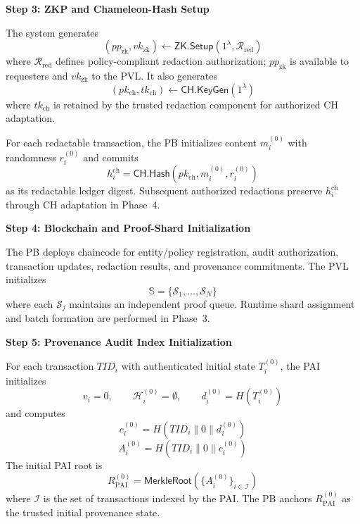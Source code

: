 \documentclass[lettersize,journal]{IEEEtran}
\begin{document}
\noindent\textbf{Step 3: ZKP and Chameleon-Hash Setup}

The system generates
\begin{equation}
(pp_{\mathrm{zk}},vk_{\mathrm{zk}})
\leftarrow
\mathsf{ZK.Setup}(1^\lambda,\mathcal{R}_{\mathrm{red}})
\label{eq:zk-setup}
\end{equation}
where $\mathcal{R}_{\mathrm{red}}$ defines policy-compliant redaction
authorization; $pp_{\mathrm{zk}}$ is available to requesters and
$vk_{\mathrm{zk}}$ to the PVL. It also generates
\begin{equation}
(pk_{\mathrm{ch}},tk_{\mathrm{ch}})
\leftarrow
\mathsf{CH.KeyGen}(1^\lambda)
\label{eq:ch-setup}
\end{equation}
where $tk_{\mathrm{ch}}$ is retained by the trusted redaction component
for authorized CH adaptation.

For each redactable transaction, the PB initializes content
$m_i^{(0)}$ with randomness $r_i^{(0)}$ and commits
\begin{equation}
h_i^{\mathrm{ch}}
=
\mathsf{CH.Hash}
(pk_{\mathrm{ch}},m_i^{(0)},r_i^{(0)})
\label{eq:initial-ch-commitment}
\end{equation}
as its redactable ledger digest. Subsequent authorized redactions preserve
$h_i^{\mathrm{ch}}$ through CH adaptation in Phase~4.

\noindent\textbf{Step 4: Blockchain and Proof-Shard Initialization}

The PB deploys chaincode for entity/policy registration, audit
authorization, transaction updates, redaction results, and provenance
commitments. The PVL initializes
\begin{equation}
\mathbb{S}
=
\{\mathcal{S}_1,\ldots,\mathcal{S}_N\}
\label{eq:proof-shards}
\end{equation}
where each $\mathcal{S}_j$ maintains an independent proof queue.
Runtime shard assignment and batch formation are performed in Phase~3.

\noindent\textbf{Step 5: Provenance Audit Index Initialization}

For each transaction $TID_i$ with authenticated initial state
$T_i^{(0)}$, the PAI initializes
\begin{equation}
v_i=0,\qquad
\mathcal{H}_i^{(0)}=\emptyset,\qquad
d_i^{(0)}=H(T_i^{(0)})
\label{eq:initial-history}
\end{equation}
and computes
\begin{equation}
c_i^{(0)}
=
H(TID_i\parallel0\parallel d_i^{(0)})
\end{equation}
\begin{equation}
A_i^{(0)}
=
H(TID_i\parallel0\parallel c_i^{(0)})
\label{eq:initial-provenance}
\end{equation}
The initial PAI root is
\begin{equation}
R_{\mathrm{PAI}}^{(0)}
=
\mathsf{MerkleRoot}
\left(
\{A_i^{(0)}\}_{i\in\mathcal{I}}
\right)
\label{eq:initial-pai-root}
\end{equation}
where $\mathcal{I}$ is the set of transactions indexed by the PAI.
The PB anchors $R_{\mathrm{PAI}}^{(0)}$ as the trusted initial
provenance state.
\smallskip
\end{document}
